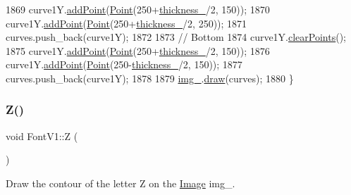 \begin{DoxyCode}
1869     curve1Y.\mbox{\hyperlink{class_bezier_curve_a38d16c18b36ae45619b05e26e226cf34}{addPoint}}(\mbox{\hyperlink{class_point}{Point}}(250+\mbox{\hyperlink{class_font_v1_aed8040e76be9a52833627b92f0fb4e5f}{thickness\_}}/2, 150));
1870     curve1Y.\mbox{\hyperlink{class_bezier_curve_a38d16c18b36ae45619b05e26e226cf34}{addPoint}}(\mbox{\hyperlink{class_point}{Point}}(250+\mbox{\hyperlink{class_font_v1_aed8040e76be9a52833627b92f0fb4e5f}{thickness\_}}/2, 250));
1871     curves.push\_back(curve1Y);
1872 
1873     \textcolor{comment}{// Bottom}
1874     curve1Y.\mbox{\hyperlink{class_bezier_curve_a0ba8ce66d5af5971ae6a1b506029728e}{clearPoints}}();
1875     curve1Y.\mbox{\hyperlink{class_bezier_curve_a38d16c18b36ae45619b05e26e226cf34}{addPoint}}(\mbox{\hyperlink{class_point}{Point}}(250+\mbox{\hyperlink{class_font_v1_aed8040e76be9a52833627b92f0fb4e5f}{thickness\_}}/2, 150));
1876     curve1Y.\mbox{\hyperlink{class_bezier_curve_a38d16c18b36ae45619b05e26e226cf34}{addPoint}}(\mbox{\hyperlink{class_point}{Point}}(250-\mbox{\hyperlink{class_font_v1_aed8040e76be9a52833627b92f0fb4e5f}{thickness\_}}/2, 150));
1877     curves.push\_back(curve1Y);
1878 
1879     \mbox{\hyperlink{class_font_v1_a00569e3e3c4b70f437b63f396f735fb0}{img\_}}.\mbox{\hyperlink{class_image_a8d162f3cab956131d58708c09aa560b0}{draw}}(curves);
1880 \}
\end{DoxyCode}
\mbox{\label{class_font_v1_a10df574bc5aa14a43988d42db4e89504}} 
\subsubsection{\texorpdfstring{Z()}{Z()}}
{\footnotesize\ttfamily void Font\+V1\+::Z (\begin{DoxyParamCaption}{ }\end{DoxyParamCaption})}



Draw the contour of the letter Z on the \mbox{\hyperlink{class_image}{Image}} img\+\_\+. 


